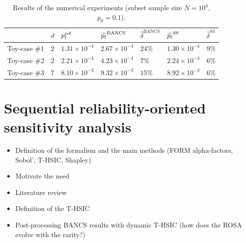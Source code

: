 \begin{table}[h]
    \centering
    \caption{Results of the numerical experiments (subset sample size $N=10^4$, $p_0=0.1$).}
    \begin{tabular}{|l|l|l||l|l||l|l|}\hline
     & $d$ & $p_\mathrm{f}^{\mathrm{ref}}$ & $\widehat{p_\mathrm{f}}^{\mathrm{BANCS}}$ & $\widehat{\delta}^{\mathrm{BANCS}}$ & $\widehat{p_\mathrm{f}}^{\mathrm{SS}}$ & $\widehat{\delta}^{\mathrm{SS}}$\\
    \hline
    Toy-case \#1 & 2 & $1.31 \times 10^{-4}$ & $2.67 \times 10^{-4}$ & $24 \%$ & $1.30 \times 10^{-4}$ & $9 \%$\\
    \hline
    Toy-case \#2 & 2 & $2.21 \times 10^{-4}$ & $4.23 \times 10^{-4}$ & $7 \%$ & $2.24 \times 10^{-4}$ & $6 \%$\\
    \hline
    Toy-case \#3 & 7 & $8.10 \times 10^{-3}$ & $9.32 \times 10^{-3}$ & $15 \%$ & $8.92 \times 10^{-3}$ & $6 \%$\\ \hline
    \end{tabular}
    \label{tab:result_table}
\end{table}



\section{Sequential reliability-oriented sensitivity analysis}
\begin{itemize}
    \item Definition of the formalism and the main methods (FORM alpha-factors, Sobol', T-HSIC, Shapley)
    \item Motivate the need
    \item Literature review 
    \item Definition of the T-HSIC 
    \item Post-processing BANCS results with dynamic T-HSIC (how does the ROSA evolve with the rarity?)
\end{itemize}





